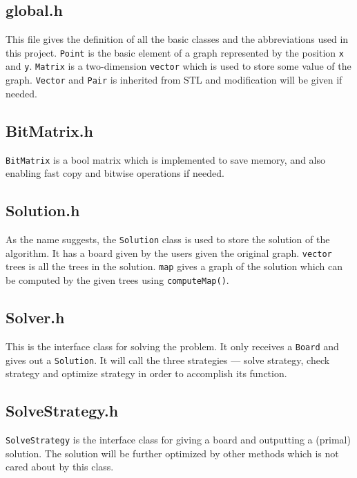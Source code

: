 \documentclass[12pt, a4paper]{article}
\begin{document}
		\subsection{global.h}

			This file gives the definition of all the basic classes and the abbreviations used in this project. \texttt{Point} is the basic element of a graph represented by the position \texttt{x} and \texttt{y}. \texttt{Matrix} is a two-dimension \texttt{vector} which is used to store some value of the graph. \texttt{Vector} and \texttt{Pair} is inherited from STL and modification will be given if needed.
		
		\subsection{BitMatrix.h}

			\texttt{BitMatrix} is a bool matrix which is implemented to save memory, and also enabling fast copy and bitwise operations if needed.
		
		\subsection{Solution.h}

			As the name suggests, the \texttt{Solution} class is used to store the solution of the algorithm. It has a board given by the users given the original graph. \texttt{vector} trees is all the trees in the solution. \texttt{map} gives a graph of the solution which can be computed by the given trees using \texttt{computeMap()}.
		
		\subsection{Solver.h}
		
			This is the interface class for solving the problem. It only receives a \texttt{Board} and gives out a \texttt{Solution}. It will call the three strategies --- solve strategy, check strategy and optimize strategy in order to accomplish its function.
		
		\subsection{SolveStrategy.h}
		
			\texttt{SolveStrategy} is the interface class for giving a board and outputting a (primal) solution. The solution will be further optimized by other methods which is not cared about by this class.
			
\end{document}
